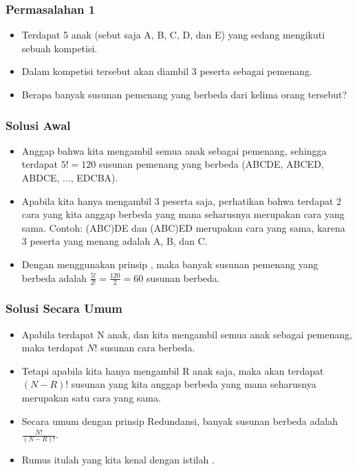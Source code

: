 \begin{frame}
\frametitle{Permasalahan 1}
\begin{itemize}
  \item Terdapat 5 anak (sebut saja A, B, C, D, dan E) yang sedang mengikuti sebuah kompetisi.
  \item Dalam kompetisi tersebut akan diambil 3 peserta sebagai pemenang.
  \item Berapa banyak susunan pemenang yang berbeda dari kelima orang tersebut?
\end{itemize}
\end{frame}

\begin{frame}
\frametitle{Solusi Awal}
\begin{itemize}
  \item Anggap bahwa kita mengambil semua anak sebagai pemenang, sehingga terdapat $5! = 120$ susunan pemenang yang berbeda (ABCDE, ABCED, ABDCE, ..., EDCBA).
  \item Apabila kita hanya mengambil 3 peserta saja, perhatikan bahwa terdapat 2 cara yang kita anggap berbeda yang mana seharusnya merupakan cara yang sama. Contoh: (ABC)DE dan (ABC)ED merupakan cara yang sama, karena 3 peserta yang menang adalah A, B, dan C.
  \item Dengan menggunakan prinsip , maka banyak susunan pemenang yang berbeda adalah $\frac{5!}{2!} = \frac{120}{2} = 60$ susunan berbeda.
\end{itemize}
\end{frame}

\begin{frame}
\frametitle{Solusi Secara Umum}
\begin{itemize}
  \item Apabila terdapat N anak, dan kita mengambil semua anak sebagai pemenang, maka terdapat $N!$ susunan cara berbeda.
  \item Tetapi apabila kita hanya mengambil R anak saja, maka akan terdapat $(N-R)!$ susunan yang kita anggap berbeda yang mana seharusnya merupakan satu cara yang sama.
  \item Secara umum dengan prinsip Redundansi, banyak susunan berbeda adalah $\frac{N!}{(N-R)!}$.
  \item Rumus itulah yang kita kenal dengan istilah .
\end{itemize}
\end{frame}


